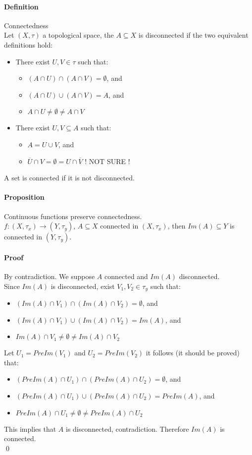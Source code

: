 \documentclass{article}
\newcommand{\func}[3]{#1 : #2 \rightarrow #3}
\newcommand{\Def}{\paragraph{Definition}}
\newcommand{\Proposition}{\paragraph{Proposition}}
\newcommand{\Proof}{\paragraph{Proof}}
\begin{document}
  \Def Connectedness
\\Let $(X, \tau)$ a topological space, the $A \subseteq X$ is disconnected if
  the two equivalent definitions hold:
  \begin{itemize}
    \item There exist $U, V \in \tau$ such that:
    \begin{itemize}
      \item $(A \cap U) \cap (A \cap V) = \emptyset$, and
      \item $(A \cap U) \cup (A \cap V) = A$, and
      \item $A \cap U \neq \emptyset \neq A \cap V$
    \end{itemize}

    \item There exist $U, V \subseteq A$ such that:
    \begin{itemize}
      \item $A = U \cup V$, and
      \item $\overline{U} \cap V = \emptyset = U \cap \overline{V}$ ! NOT SURE !
    \end{itemize}
  \end{itemize}
  A set is connected if it is not disconnected.

  \Proposition Continuous functions preserve connectedness.
\\$\func{f}{(X,\tau_x)}{(Y,\tau_y)}$, $A \subseteq X$ connected in $(X,\tau_x)$,
  then $Im(A) \subseteq Y$ is connected in $(Y,\tau_y)$.

  \Proof By contradiction. We suppose $A$ connected and $Im(A)$ disconnected.
\\Since $Im(A)$ is disconnected, exist $V_1, V_2 \in \tau_y$ such that:
  \begin{itemize}
    \item $(Im(A) \cap V_1) \cap (Im(A) \cap V_2) = \emptyset$, and
    \item $(Im(A) \cap V_1) \cup (Im(A) \cap V_2) = Im(A)$, and
    \item $Im(A) \cap V_1 \neq \emptyset \neq Im(A) \cap V_2$
  \end{itemize}
  Let $U_1 = PreIm(V_1)$ and $U_2 = PreIm(V_2)$ it follows (it should be proved)
  that:
  \begin{itemize}
    \item $(PreIm(A) \cap U_1) \cap (PreIm(A) \cap U_2) = \emptyset$, and
    \item $(PreIm(A) \cap U_1) \cup (PreIm(A) \cap U_2) = PreIm(A)$, and
    \item $PreIm(A) \cap U_1 \neq \emptyset \neq PreIm(A) \cap U_2$
  \end{itemize}
  This implies that $A$ is disconnected, contradiction. Therefore $Im(A)$ is
  connected.
\\\qed
\end{document}
